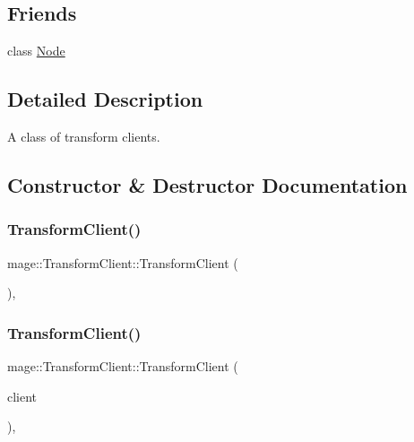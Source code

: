 \subsection*{Friends}
\begin{DoxyCompactItemize}
\item 
class \hyperlink{classmage_1_1_transform_client_a6db9d28bd448a131448276ee03de1e6d}{Node}
\end{DoxyCompactItemize}


\subsection{Detailed Description}
A class of transform clients. 

\subsection{Constructor \& Destructor Documentation}
\hypertarget{classmage_1_1_transform_client_af42a36c32cded66b699ac69a526e8105}{}\label{classmage_1_1_transform_client_af42a36c32cded66b699ac69a526e8105} 
\subsubsection{\texorpdfstring{Transform\+Client()}{TransformClient()}\hspace{0.1cm}{\footnotesize\ttfamily [1/3]}}
{\footnotesize\ttfamily mage\+::\+Transform\+Client\+::\+Transform\+Client (\begin{DoxyParamCaption}{ }\end{DoxyParamCaption})\hspace{0.3cm}{\ttfamily [private]}, {\ttfamily [delete]}}

\hypertarget{classmage_1_1_transform_client_a7b9aa8dbbb39294daceae6cc5da9c9f5}{}\label{classmage_1_1_transform_client_a7b9aa8dbbb39294daceae6cc5da9c9f5} 
\subsubsection{\texorpdfstring{Transform\+Client()}{TransformClient()}\hspace{0.1cm}{\footnotesize\ttfamily [2/3]}}
{\footnotesize\ttfamily mage\+::\+Transform\+Client\+::\+Transform\+Client (\begin{DoxyParamCaption}\item[{const \hyperlink{classmage_1_1_transform_client}{Transform\+Client} \&}]{client }\end{DoxyParamCaption})\hspace{0.3cm}{\ttfamily [private]}, {\ttfamily [delete]}}

